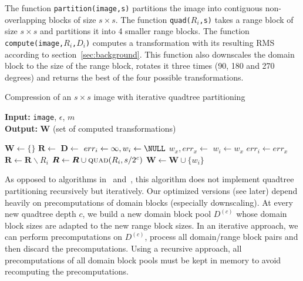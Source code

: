 The function \texttt{partition(image,s)} partitions the image into contiguous non-overlapping blocks of size $s \times s$.
The function \texttt{quad($R_i$,s)} takes a range block of size $s \times s$ and partitions it into 4 smaller range blocks.
The function \texttt{compute(image,$R_i$,$D_i$)} computes a transformation with its resulting RMS according to section~\ref{sec:background}.
This function also downscales the domain block to the size of the range block, rotates it three times (90, 180 and 270 degrees)
and returns the best of the four possible transformations.
\begin{algorithm}
\caption{Compression of an $s\times s$ image with iterative quadtree partitioning}\label{alg:baseline}
\hspace*{\algorithmicindent} \textbf{Input:} \texttt{image}, $\epsilon$, $m$ \\
\hspace*{\algorithmicindent} \textbf{Output:} $\boldsymbol{W}$ (set of computed transformations)
\begin{algorithmic}[1]
  \State $\boldsymbol{W} \gets \{\}$
  \State $\boldsymbol{R} \gets $ 
        \State $\boldsymbol{D} \gets $ 
            \State $err_i \gets \infty, w_i \gets \NULL$
              \State $w_x, err_x \gets $ 
                \State $w_i \gets w_x$
                \State $err_i \gets err_x$
              \EndIf
            \EndFor
        \EndFor
        \State $\boldsymbol{R} \gets \boldsymbol{R} \backslash  R_i$
          \State $\boldsymbol{R} \gets \boldsymbol{R} \cup  \Call{quad}{R_i, s/2^c}$
        \Else
          \State $\boldsymbol{W} \gets \boldsymbol{W} \cup \{w_i\}$
        \EndIf
    \EndFor
\end{algorithmic}
\end{algorithm}

As opposed to algorithms in~\cite{fisher2012} and~\cite{github-cpp}, this
algorithm does not implement quadtree partitioning recursively but iteratively.
Our optimized versions (see later) depend heavily on precomputations of domain
blocks (especially downscaling). At every new quadtree depth $c$, we build a new
domain block pool $D^{(c)}$ whose domain block sizes are adapted to the new
range block sizes. In an iterative approach, we can perform
precomputations on $D^{(c)}$, process all domain/range block pairs and then
discard the precomputations. Using a recursive approach, all precomputations of
all domain block pools must be kept in memory to avoid recomputing the
precomputations.

